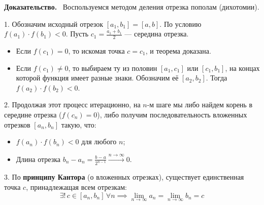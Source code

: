 \documentclass[a4paper,12pt]{article}
\newcommand{\myproof}{\textbf{Доказательство.}\ }
\begin{document}
	\begin{center}
	\end{center}
	
	\myproof
	Воспользуемся методом деления отрезка пополам (дихотомии).
	
	1. Обозначим исходный отрезок $[a_1, b_1] = [a, b]$. По условию $f(a_1) \cdot f(b_1) < 0$.
	Пусть $c_1 = \frac{a_1 + b_1}{2}$ — середина отрезка.
	\begin{itemize}
		\item Если $f(c_1) = 0$, то искомая точка $c = c_1$, и теорема доказана.
		\item Если $f(c_1) \neq 0$, то выбираем ту из половин $[a_1, c_1]$ или $[c_1, b_1]$, на концах которой функция имеет разные знаки. Обозначим её $[a_2, b_2]$. Тогда $f(a_2) \cdot f(b_2) < 0$.
	\end{itemize}
	
	2. Продолжая этот процесс итерационно, на $n$-м шаге мы либо найдем корень в середине отрезка ($f(c_n) = 0$), либо получим последовательность вложенных отрезков $[a_n, b_n]$ такую, что:
	\begin{itemize}
		\item $f(a_n) \cdot f(b_n) < 0$ для любого $n$;
		\item Длина отрезка $b_n - a_n = \frac{b-a}{2^{n-1}} \xrightarrow{n \to \infty} 0$.
	\end{itemize}
	
	3. По \textbf{принципу Кантора} (о вложенных отрезках), существует единственная точка $c$, принадлежащая всем отрезкам:
	$$ \exists! \, c \in [a_n, b_n] \, \forall n \implies \lim_{n \to \infty} a_n = \lim_{n \to \infty} b_n = c $$
	
\end{document}

